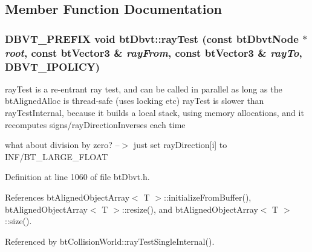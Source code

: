 \subsection{Member Function Documentation}
\hypertarget{structbt_dbvt_8e316ee3bc9bd7b7354086c0c558cfb5}{
\subsubsection[rayTest]{\setlength{\rightskip}{0pt plus 5cm}DBVT\_\-PREFIX void btDbvt::rayTest (const btDbvtNode $\ast$ {\em root}, \/  const btVector3 \& {\em rayFrom}, \/  const btVector3 \& {\em rayTo}, \/  DBVT\_\-IPOLICY)}}
\label{structbt_dbvt_8e316ee3bc9bd7b7354086c0c558cfb5}


rayTest is a re-entrant ray test, and can be called in parallel as long as the btAlignedAlloc is thread-safe (uses locking etc) rayTest is slower than rayTestInternal, because it builds a local stack, using memory allocations, and it recomputes signs/rayDirectionInverses each time 

what about division by zero? --$>$ just set rayDirection\mbox{[}i\mbox{]} to INF/BT\_\-LARGE\_\-FLOAT 

Definition at line 1060 of file btDbvt.h.

References btAlignedObjectArray$<$ T $>$::initializeFromBuffer(), btAlignedObjectArray$<$ T $>$::resize(), and btAlignedObjectArray$<$ T $>$::size().

Referenced by btCollisionWorld::rayTestSingleInternal().

